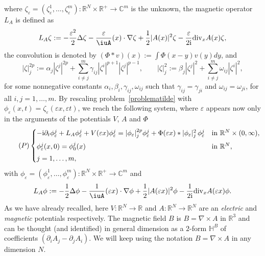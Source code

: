 \documentclass[11pt]{amsart}
\numberwithin{equation}{section}
\theoremstyle{definition}
\begin{document}
where $\zeta_{\varepsilon}=(\zeta^1_{\varepsilon},\dots,\zeta^m_{\varepsilon}):{{\mathbb R}}^N\times {{\mathbb R}}^+\to{{\mathbb C}}^m$ is the unknown, the magnetic operator $L_A$
is defined as
\begin{equation*}
L_A\zeta:=-\frac{{\varepsilon}^2}{2}\Delta\zeta-\frac{\varepsilon}\iuA(x)\cdot\nabla\zeta
+\frac{1}{2}|A(x)|^2\zeta-\frac{\varepsilon}{2{{\rm i}}}{\rm div}_xA(x)\zeta,
\end{equation*}
the convolution is denoted by $(\Phi*v)(x):=\int\Phi(x-y)v(y)dy$, and
$$
|\zeta|_j^{2p}:=\alpha_j|\zeta^j|^{2p}
+\sum_{i\neq j}^m \gamma_{ij}|\zeta^i|^{p+1}|\zeta^j|^{p-1},\qquad
|\zeta|^2_j:=\beta_j|\zeta^j|^2+\sum_{i\neq j}^m\omega_{ij}|\zeta^i|^2,
$$
for some nonnegative constants $\alpha_i,\beta_i,\gamma_{ij},\omega_{ij}$ such that
$\gamma_{ij}=\gamma_{ji}$ and $\omega_{ij}=\omega_{ji}$, for all $i,j=1,\dots,m$.
By rescaling problem~\eqref{problematilde} with $\phi_{\varepsilon}(x,t)=\zeta_{\varepsilon}({\varepsilon} x, {\varepsilon} t)$,
we reach the following system, where ${\varepsilon}$ appears
now only in the arguments of the potentials $V$, $A$ and $\Phi$
\begin{equation}
    \label{problema}
    \tag{$P$}
    \begin{cases}
        -{{\rm i}} \partial_t\phi_{\varepsilon}^j+L_A\phi_{\varepsilon}^j+V({\varepsilon} x)\phi_{\varepsilon}^j=|\phi_{\varepsilon}|^{2p}_j \phi_{\varepsilon}^j
        +\Phi({\varepsilon} x)*|\phi_{\varepsilon}|^2_j\,\phi_{\varepsilon}^j & \text{in ${{\mathbb R}}^N\times (0,\infty)$}, \\
        \noalign{\vskip5pt}
        \phi_{\varepsilon}^j(x,0)=\phi_0^j(x) & \text{in ${{\mathbb R}}^N$}, \\
        \noalign{\vskip3pt}
        j=1,\dots,m,
    \end{cases}
\end{equation}
with $\phi_{\varepsilon}=(\phi^1_{\varepsilon},\dots,\phi^m_{\varepsilon}):{{\mathbb R}}^N\times
{{\mathbb R}}^+\to{{\mathbb C}}^m$ and
\begin{equation}
\label{MagnOper}
L_A\phi:=-\frac{1}{2}\Delta\phi-\frac{1}\iuA({\varepsilon}
x)\cdot\nabla\phi +\frac{1}{2}|A({\varepsilon} x)|^2\phi-\frac{1}{2{{\rm i}}}{\rm
div}_xA({\varepsilon} x)\phi.
\end{equation}
As we have already recalled, here $V:{{\mathbb R}}^N\to{{\mathbb R}}$ and $A:{{\mathbb R}}^N\to{{\mathbb R}}^N$ are an {\em electric} and
{\em magnetic} potentials respectively. The magnetic field $B$ is
$B=\nabla\times A$ in ${{\mathbb R}}^3$ and can be thought (and identified)
in general dimension as a $2$-form ${\mathbb H}^B$ of coefficients
$(\partial_i A_j-\partial_j A_i)$. We will keep
using the notation $B=\nabla\times A$ in any dimension $N$.
\end{document}
